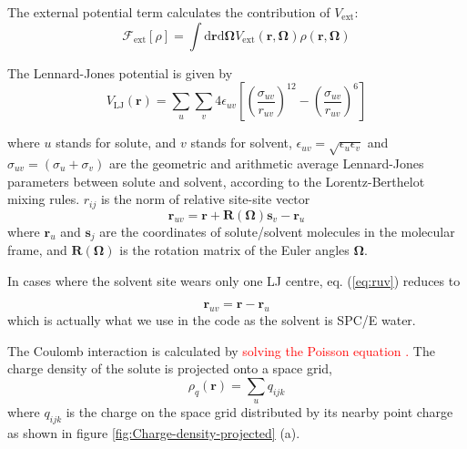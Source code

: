 The external potential term calculates the contribution of $V_{\mathrm{ext}}$:
\begin{equation}
\mathcal{F}_{\mathrm{ext}}[\rho]=\int\mathrm{d}\mathbf{r}\mathrm{d}\mathbf{\mathbf{\Omega}}V_{\mathrm{ext}}(\mathbf{r},\mathbf{\mathbf{\mathbf{\mathbf{\Omega}}}})\rho(\mathbf{r},\mathbf{\mathbf{\mathbf{\mathbf{\Omega}}}})
\end{equation}

The Lennard-Jones potential is given by
\begin{equation}
V_{\mathrm{LJ}}(\mathbf{r})=\sum_{u}\sum_{v}4\epsilon_{uv}\left[\left(\dfrac{\sigma_{uv}}{r_{uv}}\right)^{12}-\left(\dfrac{\sigma_{uv}}{r_{uv}}\right)^{6}\right]\label{eq:LJ}
\end{equation}

where $u$ stands for solute, and $v$ stands for solvent, $\epsilon_{uv}=\sqrt{\epsilon_{u}\epsilon_{v}}$
and $\sigma_{uv}=\left(\sigma_{u}+\sigma_{v}\right)$ are the geometric
and arithmetic average Lennard-Jones parameters between solute and
solvent, according to the Lorentz-Berthelot mixing rules. $r_{ij}$
is the norm of relative site-site vector
\begin{equation}
\mathbf{r}_{uv}=\mathbf{r}+\mathbf{R}(\mathbf{\Omega})\mathbf{s}_{v}-\mathbf{r}_{u}\label{eq:ruv}
\end{equation}
where $\mathbf{r}_{u}$ and $\mathbf{s}_{j}$ are the coordinates
of solute/solvent molecules in the molecular frame, and $\mathbf{R}(\mathbf{\Omega})$
is the rotation matrix of the Euler angles $\mathbf{\Omega}$.

In cases where the solvent site wears only one LJ centre, eq. (\ref{eq:ruv})
reduces to

\begin{equation}
\mathbf{r}_{uv}=\mathbf{r}-\mathbf{r}_{u}
\end{equation}
which is actually what we use in the code as the solvent is SPC/E
water.

The Coulomb interaction is calculated by \textcolor{red}{solving the
Poisson equation \citep{Marchi_2001}.} The charge density of the
solute is projected onto a space grid,
\begin{equation}
\rho_{q}(\mathbf{r})=\sum_{u}q_{ijk}
\end{equation}
where $q_{ijk}$ is the charge on the space grid distributed by its
nearby point charge as shown in figure \ref{fig:Charge-density-projected}
(a).

